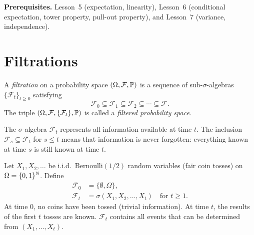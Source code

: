 \documentclass[11pt,a4paper]{article}
\begin{document}
\medskip
\noindent\textbf{Prerequisites.}
Lesson~5 (expectation, linearity), Lesson~6 (conditional
expectation, tower property, pull-out property), and Lesson~7
(variance, independence).


\section{Filtrations}
\label{sec:filtrations}

\begin{definition}[Filtration]
\label{def:filtration}
A \emph{filtration} on a probability space
$(\Omega, \mathcal{F}, \mathbb{P})$ is a sequence of
sub-$\sigma$-algebras
$\{\mathcal{F}_t\}_{t \geq 0}$ satisfying
\begin{equation}
  \mathcal{F}_0 \subseteq \mathcal{F}_1 \subseteq
  \mathcal{F}_2 \subseteq \cdots \subseteq \mathcal{F}.
  \label{eq:filtration}
\end{equation}
The triple $(\Omega, \mathcal{F}, \{\mathcal{F}_t\}, \mathbb{P})$
is called a \emph{filtered probability space}.
\end{definition}

\begin{remark}[Interpretation]
The $\sigma$-algebra $\mathcal{F}_t$ represents all information
available at time $t$.  The inclusion
$\mathcal{F}_s \subseteq \mathcal{F}_t$ for $s \leq t$ means
that information is never forgotten: everything known at time
$s$ is still known at time $t$.
\end{remark}

\begin{example}
\label{ex:coin_filtration}
Let $X_1, X_2, \ldots$ be i.i.d.\ Bernoulli$(1/2)$ random
variables (fair coin tosses) on $\Omega = \{0,1\}^{\mathbb{N}}$.  Define
\begin{align}
  \mathcal{F}_0 &= \{\emptyset, \Omega\},
  \nonumber\\
  \mathcal{F}_t &= \sigma(X_1, X_2, \ldots, X_t)
  \quad \text{for } t \geq 1.
  \label{eq:coin_filtration}
\end{align}
At time $0$, no coins have been tossed (trivial information).
At time $t$, the results of the first $t$ tosses are known.
$\mathcal{F}_t$ contains all events that can be determined from
$(X_1, \ldots, X_t)$.
\end{example}
\end{document}
